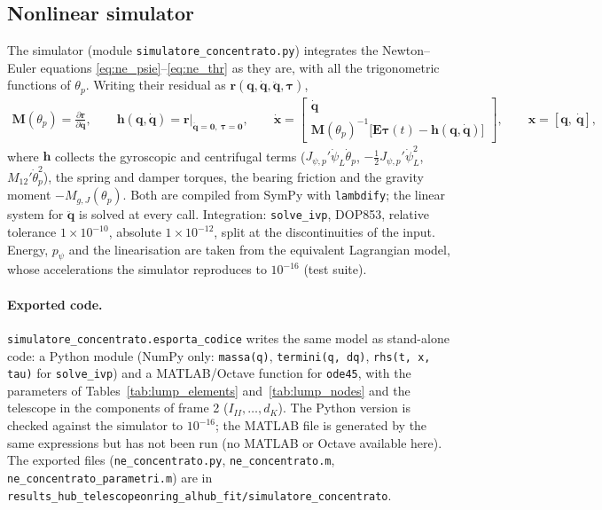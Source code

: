 \documentclass[10pt,a4paper]{article}
\numberwithin{equation}{section}
\begin{document}
\subsection{Nonlinear simulator}\label{subsec:lump_sim}
The simulator (module \texttt{simulatore\_concentrato.py}) integrates the Newton--Euler equations \eqref{eq:ne_psie}--\eqref{eq:ne_thr} as they are, with all the trigonometric functions of $\theta_p$. Writing their residual as $\mathbf r(\mathbf q, \dot{\mathbf q}, \ddot{\mathbf q}, \boldsymbol\tau)$,
\begin{gather}
\mathbf M(\theta_p) = \frac{\partial\mathbf r}{\partial\ddot{\mathbf q}},\qquad \mathbf h(\mathbf q, \dot{\mathbf q}) = \mathbf r\big|_{\ddot{\mathbf q} = \mathbf 0,\ \boldsymbol\tau = \mathbf 0},\qquad \dot{\mathbf x} = \begin{bmatrix}\dot{\mathbf q}\\ \mathbf M(\theta_p)^{-1}\bigl[\mathbf E\boldsymbol\tau(t) - \mathbf h(\mathbf q, \dot{\mathbf q})\bigr]\end{bmatrix},\qquad \mathbf x = [\mathbf q,\ \dot{\mathbf q}],
\end{gather}
where $\mathbf h$ collects the gyroscopic and centrifugal terms ($J_{\psi,p}'\dot\psi_L\dot\theta_p$, $-\tfrac12 J_{\psi,p}'\dot\psi_L^2$, $M_{12}'\dot\theta_p^2$), the spring and damper torques, the bearing friction and the gravity moment $-M_{g,J}(\theta_p)$. Both are compiled from SymPy with \texttt{lambdify}; the linear system for $\ddot{\mathbf q}$ is solved at every call. Integration: \texttt{solve\_ivp}, DOP853, relative tolerance $1\times10^{-10}$, absolute $1\times10^{-12}$, split at the discontinuities of the input. Energy, $p_\psi$ and the linearisation are taken from the equivalent Lagrangian model, whose accelerations the simulator reproduces to $10^{-16}$ (test suite).
\paragraph{Exported code.} \texttt{simulatore\_concentrato.esporta\_codice} writes the same model as stand-alone code: a Python module (NumPy only: \texttt{massa(q)}, \texttt{termini(q, dq)}, \texttt{rhs(t, x, tau)} for \texttt{solve\_ivp}) and a MATLAB/Octave function for \texttt{ode45}, with the parameters of Tables~\ref{tab:lump_elements} and~\ref{tab:lump_nodes} and the telescope in the components of frame 2 ($I_{II}, \dots, d_K$). The Python version is checked against the simulator to $10^{-16}$; the MATLAB file is generated by the same expressions but has not been run (no MATLAB or Octave available here). The exported files (\texttt{ne\_concentrato.py}, \texttt{ne\_concentrato.m}, \texttt{ne\_concentrato\_parametri.m}) are in \texttt{results\_hub\_telescopeonring\_alhub\_fit/simulatore\_concentrato}.
\end{document}
